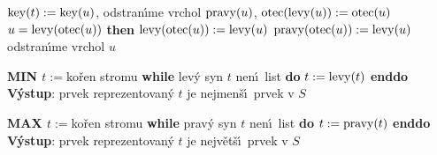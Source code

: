 \phantom{------}$\operatorname{key}(t):=\operatorname{key}(u)$, odstran\'\i me vrchol $\operatorname{pravy}(u)$,\newline 
\phantom{------}$\operatorname{otec}(\operatorname{levy}(u)):=\operatorname{otec}(u)$\newline 
\phantom{------}{\bf if} $u=\operatorname{levy}(\operatorname{otec}(u))$ {\bf then}\newline 
\phantom{---------}$\operatorname{levy}(\operatorname{otec}(u)):=\operatorname{levy}(u)$\newline 
\phantom{------}{\bf else}\newline 
\phantom{---------}$\operatorname{pravy}(\operatorname{otec}(u)):=\operatorname{levy}(u)$\newline 
\phantom{------}{\bf endif\newline}
\phantom{------}odstran\'\i me vrchol $u$\newline 
\phantom{---}{\bf endif\newline 
endif}
\medskip

{\bf MIN\newline 
$t:=$}ko\v ren stromu\newline 
{\bf while} lev\'y syn $t$ nen\'\i\ list {\bf do} $t:=\operatorname{levy}(t)$ {\bf enddo\newline 
V\'ystup}: prvek reprezentovan\'y $t$ je nejmen\v s\'\i\ prvek v $
S$
\medskip

{\bf MAX\newline 
$t:=$}ko\v ren stromu\newline 
{\bf while} prav\'y syn $t$ nen\'\i\ list {\bf do} $t:=\operatorname{pravy}(t)$ {\bf enddo\newline 
V\'ystup}: prvek reprezentovan\'y $t$ je nejv\v et\v s\'\i\ prvek v $
S$
\medskip

